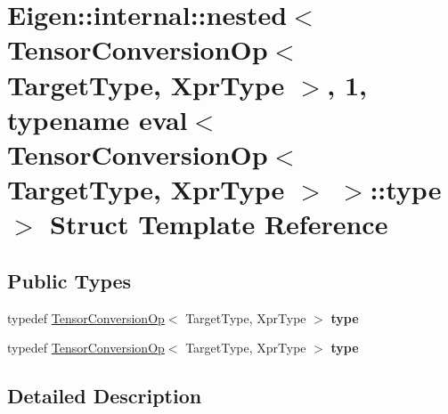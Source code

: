\hypertarget{struct_eigen_1_1internal_1_1nested_3_01_tensor_conversion_op_3_01_target_type_00_01_xpr_type_01_b83af6d243a47c048dc01ffbe6156814}{}\section{Eigen\+:\+:internal\+:\+:nested$<$ Tensor\+Conversion\+Op$<$ Target\+Type, Xpr\+Type $>$, 1, typename eval$<$ Tensor\+Conversion\+Op$<$ Target\+Type, Xpr\+Type $>$ $>$\+:\+:type $>$ Struct Template Reference}
\label{struct_eigen_1_1internal_1_1nested_3_01_tensor_conversion_op_3_01_target_type_00_01_xpr_type_01_b83af6d243a47c048dc01ffbe6156814}
\subsection*{Public Types}
\begin{DoxyCompactItemize}
\item 
\mbox{\label{struct_eigen_1_1internal_1_1nested_3_01_tensor_conversion_op_3_01_target_type_00_01_xpr_type_01_b83af6d243a47c048dc01ffbe6156814_a1574328f94362cc08adb21dfeb100018}} 
typedef \hyperlink{class_eigen_1_1_tensor_conversion_op}{Tensor\+Conversion\+Op}$<$ Target\+Type, Xpr\+Type $>$ {\bfseries type}
\item 
\mbox{\label{struct_eigen_1_1internal_1_1nested_3_01_tensor_conversion_op_3_01_target_type_00_01_xpr_type_01_b83af6d243a47c048dc01ffbe6156814_a1574328f94362cc08adb21dfeb100018}} 
typedef \hyperlink{class_eigen_1_1_tensor_conversion_op}{Tensor\+Conversion\+Op}$<$ Target\+Type, Xpr\+Type $>$ {\bfseries type}
\end{DoxyCompactItemize}


\subsection{Detailed Description}
